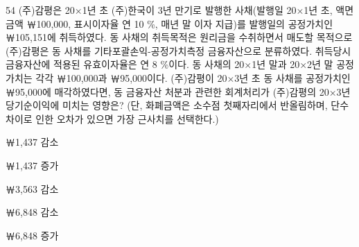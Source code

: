 \begin{question}{54}
(주)감평은 20×1년 초 (주)한국이 3년 만기로 발행한 사채(발행일 20×1년 초, 액면금액 ￦100,000, 표시이자율 연 10 \%, 매년 말 이자 지급)를 발행일의 공정가치인 ￦105,151에 취득하였다. 동 사채의 취득목적은 원리금을 수취하면서 매도할 목적으로 (주)감평은 동 사채를 기타포괄손익-공정가치측정 금융자산으로 분류하였다. 취득당시 금융자산에 적용된 유효이자율은 연 8 \%이다. 동 사채의 20×1년 말과 20×2년 말 공정가치는 각각 ￦100,000과 ￦95,000이다. (주)감평이 20×3년 초 동 사채를 공정가치인 ￦95,000에 매각하였다면, 동 금융자산 처분과 관련한 회계처리가 (주)감평의 20×3년 당기순이익에 미치는 영향은? (단, 화폐금액은 소수점 첫째자리에서 반올림하며, 단수차이로 인한 오차가 있으면 가장 근사치를 선택한다.)
\begin{choices}
  \item ￦1,437 감소
  \item ￦1,437 증가
  \item ￦3,563 감소
  \item ￦6,848 감소
  \item ￦6,848 증가
\end{choices}
\end{question}
